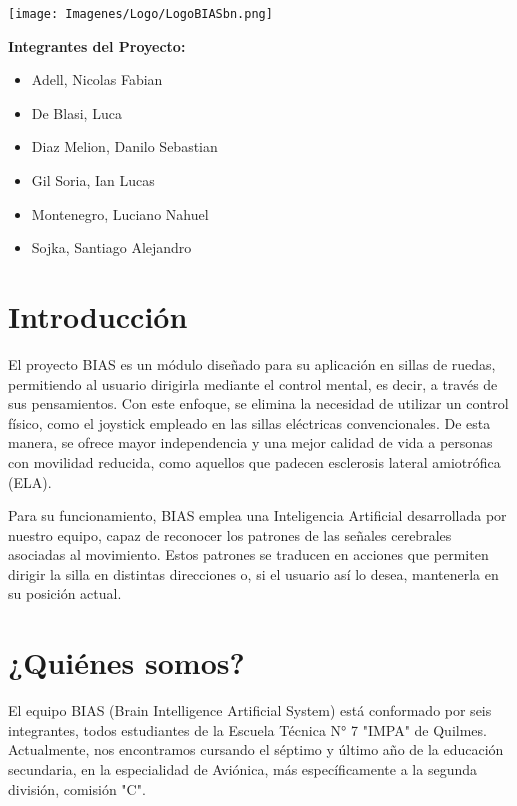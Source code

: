\documentclass{article}
\begin{document}
\date{} 

\begin{center}
    \texttt{[image: Imagenes/Logo/LogoBIASbn.png]}\\ 
\end{center}

\title{}

\vspace{1cm} 

\textbf{Integrantes del Proyecto:} 

\begin{itemize}
    \item Adell, Nicolas Fabian
    \item De Blasi, Luca
    \item Diaz Melion, Danilo Sebastian
    \item Gil Soria, Ian Lucas
    \item Montenegro, Luciano Nahuel
    \item Sojka, Santiago Alejandro
\end{itemize}

\tableofcontents 

\newpage 

\section{Introducción}
El proyecto BIAS es un módulo diseñado para su aplicación en sillas de ruedas, permitiendo al usuario dirigirla mediante el control mental, es decir, a través de sus pensamientos. Con este enfoque, se elimina la necesidad de utilizar un control físico, como el joystick empleado en las sillas eléctricas convencionales. De esta manera, se ofrece mayor independencia y una mejor calidad de vida a personas con movilidad reducida, como aquellos que padecen esclerosis lateral amiotrófica (ELA).


Para su funcionamiento, BIAS emplea una Inteligencia Artificial desarrollada por nuestro equipo, capaz de reconocer los patrones de las señales cerebrales asociadas al movimiento. Estos patrones se traducen en acciones que permiten dirigir la silla en distintas direcciones o, si el usuario así lo desea, mantenerla en su posición actual.

\section{¿Quiénes somos?}
El equipo BIAS (Brain Intelligence Artificial System) está conformado por seis integrantes, todos estudiantes de la Escuela Técnica N° 7 "IMPA" de Quilmes. Actualmente, nos encontramos cursando el séptimo y último año de la educación secundaria, en la especialidad de Aviónica, más específicamente a la segunda división, comisión "C".
\end{document}
